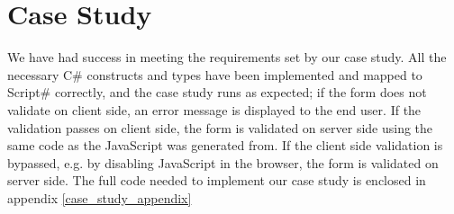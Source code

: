 \section{Case Study} %
\label{sec:reflection_on_case_study}

	We have had success in meeting the requirements set by our case study. All the necessary C\# constructs and types have been implemented and mapped to Script\# correctly, and the case study runs as expected; if the form does not validate on client side, an error message is displayed to the end user. If the validation passes on client side, the form is validated on server side using the same code as the JavaScript was generated from. If the client side validation is bypassed, e.g. by disabling JavaScript in the browser, the form is validated on server side. The full code needed to implement our case study is enclosed in appendix \ref{case_study_appendix} 







